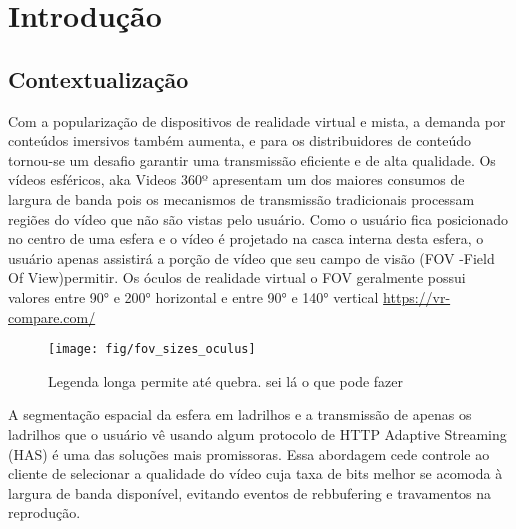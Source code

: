 
\chapter{Introdução}\label{Cap:Introduction}

	
\section{Contextualização}

Com a popularização de dispositivos de realidade virtual e mista, a demanda por conteúdos imersivos também aumenta, e para os distribuidores de conteúdo tornou-se um desafio garantir uma transmissão eficiente e de alta qualidade. Os vídeos esféricos, aka Videos 360º apresentam um dos maiores consumos de largura de banda pois os mecanismos de transmissão tradicionais processam regiões do vídeo que não são vistas pelo usuário. Como o usuário fica posicionado no centro de uma esfera e o vídeo é projetado na casca interna desta esfera, o usuário apenas assistirá a porção de vídeo que seu campo de visão (FOV -Field Of View)permitir. Os óculos de realidade virtual o FOV geralmente possui valores entre 90° e 200° horizontal e entre 90° e 140° vertical 
\href{https://vr-compare.com/}{https://vr-compare.com/}

\begin{figure}[tbh]
	\centering
	\texttt{[image: fig/fov\_sizes\_oculus]}
	\caption[legenda curta]{Legenda longa permite até quebra. sei lá o que pode fazer}
	\label{fig:fovsizesoculus}
\end{figure}

A segmentação espacial da esfera em ladrilhos e a transmissão de apenas os ladrilhos que o usuário vê usando algum protocolo de HTTP Adaptive Streaming (HAS) é uma das soluções mais promissoras. Essa abordagem cede controle ao cliente de selecionar a qualidade do vídeo cuja taxa de bits melhor se acomoda à largura de banda disponível, evitando eventos de rebbufering e travamentos na reprodução.

